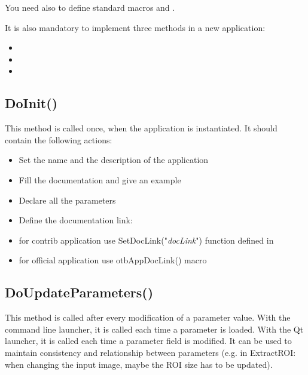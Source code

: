 You need also to define standard macros  and
.
 
It is also mandatory to implement three methods in a new application:
\begin{itemize}
  \item {}
  \item {}
  \item {}
\end{itemize}

\subsection{DoInit()}
\label{sec:appDoInit}
This method is called once, when the application is instantiated. It should 
contain the following actions:
\begin{itemize}
  \item Set the name and the description of the application
  \item Fill the documentation and give an example
  \item Declare all the parameters
  \item Define the documentation link:
    \item for contrib application use SetDocLink("\textit{docLink}") function defined in 
    \item for official application use otbAppDocLink() macro
\end{itemize}


\subsection{DoUpdateParameters()}
\label{sec:appDoUpdateParameters}
This method is called after every modification of a parameter value. With the command 
line launcher, it is called each time a parameter is loaded. With the Qt launcher, it
is called each time a parameter field is modified. It can be used to maintain consistency and relationship
between parameters (e.g. in ExtractROI: when changing the input image, maybe the ROI size 
has to be updated).

